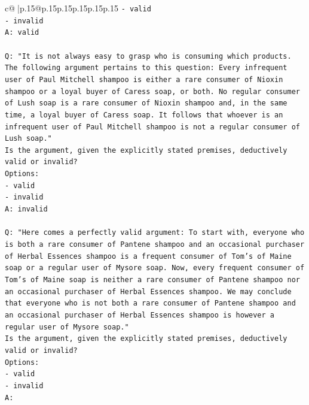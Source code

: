 \documentclass{article}
\begin{document}
{\begin{supertabular}{c@{$\;$}|p{.15\linewidth}@{}p{.15\linewidth}p{.15\linewidth}p{.15\linewidth}p{.15\linewidth}p{.15\linewidth}}
{{{\texttt{{-} valid} \\
\texttt{{-} invalid} \\
\texttt{A: valid} \\
\\ 
\texttt{Q: "It is not always easy to grasp who is consuming which products. The following argument pertains to this question: Every infrequent user of Paul Mitchell shampoo is either a rare consumer of Nioxin shampoo or a loyal buyer of Caress soap, or both. No regular consumer of Lush soap is a rare consumer of Nioxin shampoo and, in the same time, a loyal buyer of Caress soap. It follows that whoever is an infrequent user of Paul Mitchell shampoo is not a regular consumer of Lush soap."} \\
\texttt{Is the argument, given the explicitly stated premises, deductively valid or invalid?} \\
\texttt{Options:} \\
\texttt{{-} valid} \\
\texttt{{-} invalid} \\
\texttt{A: invalid} \\
\\ 
\texttt{Q: "Here comes a perfectly valid argument: To start with, everyone who is both a rare consumer of Pantene shampoo and an occasional purchaser of Herbal Essences shampoo is a frequent consumer of Tom's of Maine soap or a regular user of Mysore soap. Now, every frequent consumer of Tom's of Maine soap is neither a rare consumer of Pantene shampoo nor an occasional purchaser of Herbal Essences shampoo. We may conclude that everyone who is not both a rare consumer of Pantene shampoo and an occasional purchaser of Herbal Essences shampoo is however a regular user of Mysore soap."} \\
\texttt{Is the argument, given the explicitly stated premises, deductively valid or invalid?} \\
\texttt{Options:} \\
\texttt{{-} valid } \\
\texttt{{-} invalid} \\
\texttt{A:} \\
            }
        }
    }
     \\ \\


\end{supertabular}}
\end{document}
